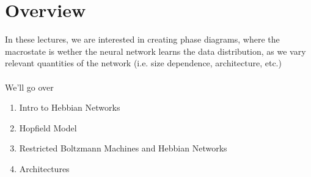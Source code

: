 \section{Overview}
In these lectures, we are interested in creating phase diagrams, where the macrostate is wether the neural network learns the data distribution, as we vary relevant quantities of the network (i.e. size dependence, architecture, etc.)\\
\\
We'll go over
\begin{enumerate}
	\item Intro to Hebbian Networks
	\item Hopfield Model
	\item Restricted Boltzmann Machines and Hebbian Networks
	\item Architectures
\end{enumerate}

